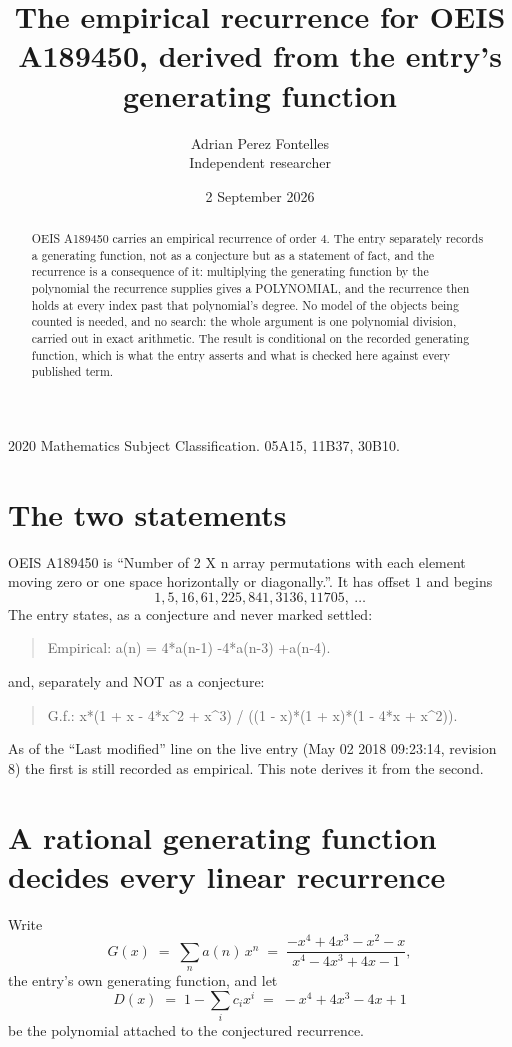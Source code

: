 \documentclass[11pt,a4paper]{article}
\title{The empirical recurrence for OEIS A189450, derived from the entry's generating function}
\author{Adrian Perez Fontelles\\ \small Independent researcher}
\date{2 September 2026}
\theoremstyle{plain}
\theoremstyle{definition}
\begin{document}
\maketitle

\begin{abstract}
OEIS A189450 carries an empirical recurrence of order $4$. The entry separately records a
generating function, not as a conjecture but as a statement of fact, and the recurrence is a
consequence of it: multiplying the generating function by the polynomial the recurrence
supplies gives a POLYNOMIAL, and the recurrence then holds at every index past that
polynomial's degree. No model of the objects being counted is needed, and no search: the
whole argument is one polynomial division, carried out in exact arithmetic. The result is
conditional on the recorded generating function, which is what the entry asserts and what is
checked here against every published term.
\end{abstract}

\noindent\small 2020 Mathematics Subject Classification. 05A15, 11B37, 30B10.\normalsize

\section{The two statements}

OEIS A189450 is ``Number of 2 X n array permutations with each element moving zero or one space horizontally or diagonally.''. It has offset $1$ and begins
\[
1, 5, 16, 61, 225, 841, 3136, 11705,\ \dots
\]
The entry states, as a conjecture and never marked settled:
\begin{quote}
Empirical: a(n) = 4*a(n-1) -4*a(n-3) +a(n-4).
\end{quote}
and, separately and NOT as a conjecture:
\begin{quote}
G.f.: x*(1 + x - 4*x\^{}2 + x\^{}3) / ((1 - x)*(1 + x)*(1 - 4*x + x\^{}2)).
\end{quote}
As of the ``Last modified'' line on the live entry (May 02 2018 09:23:14, revision 8) the first is still
recorded as empirical. This note derives it from the second.

\section{A rational generating function decides every linear recurrence}

Write
\[
G(x)\;=\;\sum_{n}a(n)\,x^{n}\;=\;\frac{- x^{4} + 4 x^{3} - x^{2} - x}{x^{4} - 4 x^{3} + 4 x - 1},
\]
the entry's own generating function, and let
\[
D(x)\;=\;1-\sum_i c_i x^{i}\;=\;- x^{4} + 4 x^{3} - 4 x + 1
\]
be the polynomial attached to the conjectured recurrence.
\end{document}
